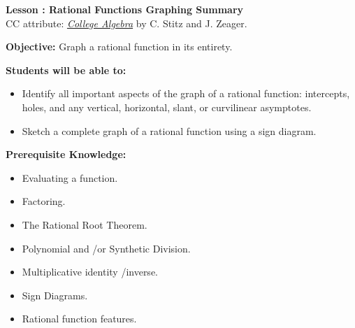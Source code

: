 \documentclass[12pt]{article}
\theoremstyle{definition}
\begin{document}
{\bf \large Lesson : Rational Functions Graphing Summary}
\\ CC attribute: \href{http://www.stitz-zeager.com}{\it{College Algebra}} by C. Stitz and J. Zeager. 
\hfill \doclicenseImage[imagewidth=5em]\\
\par
{\bf Objective:} Graph a rational function in its entirety.\\
\par
{\bf Students will be able to:}
\begin{itemize}
	\item Identify all important aspects of the graph of a rational function: intercepts, holes, and any vertical, horizontal, slant, or curvilinear asymptotes.
	\item Sketch a complete graph of a rational function using a sign diagram.
\end{itemize}
{\bf Prerequisite Knowledge:}
\begin{itemize}
	\item Evaluating a function.
	\item Factoring.
	\item The Rational Root Theorem.
	\item Polynomial and \slash or Synthetic Division.
	\item Multiplicative identity \slash inverse.
	\item Sign Diagrams.
	\item Rational function features.
\end{itemize}
\hrulefill
\end{document}
